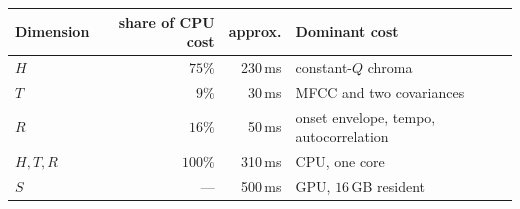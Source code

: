 \begin{tabular}{lrrl}
\toprule
Dimension & share of CPU cost & approx. & Dominant cost \\
\midrule
$H$ & $75\%$ & 230\,ms & constant-$Q$ chroma \\
$T$ & $9\%$ & 30\,ms & MFCC and two covariances \\
$R$ & $16\%$ & 50\,ms & onset envelope, tempo, autocorrelation \\
\midrule
$H,T,R$ & $100\%$ & 310\,ms & CPU, one core \\
$S$ & --- & 500\,ms & GPU, $16$\,GB resident \\
\bottomrule
\end{tabular}
